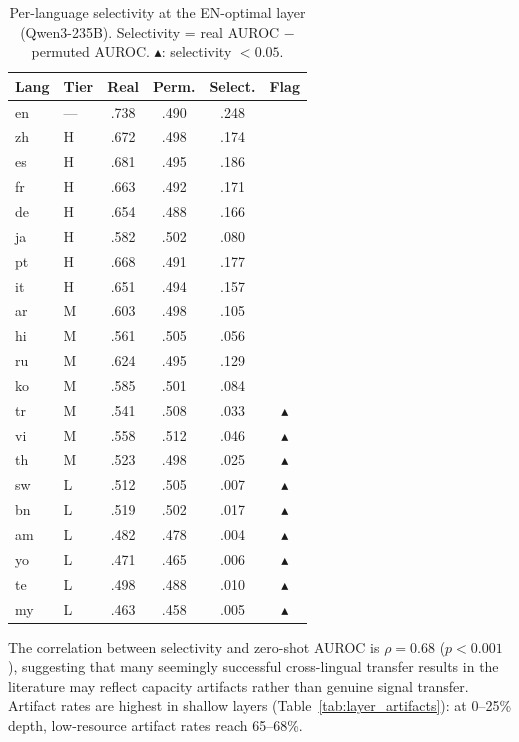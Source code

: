 \documentclass[11pt,a4paper]{article}
\newcommand{\auroc}{AUROC}
\begin{document}
\begin{table}[t]
\centering
\small
\caption{Per-language selectivity at the EN-optimal layer (Qwen3-235B). Selectivity = real \auroc{} $-$ permuted \auroc{}. $\blacktriangle$: selectivity $< 0.05$.}
\label{tab:selectivity}
\begin{tabular}{llcccc}
\toprule
Lang & Tier & Real & Perm. & Select. & Flag \\
\midrule
en & --- & .738 & .490 & .248 & \\
zh & H & .672 & .498 & .174 & \\
es & H & .681 & .495 & .186 & \\
fr & H & .663 & .492 & .171 & \\
de & H & .654 & .488 & .166 & \\
ja & H & .582 & .502 & .080 & \\
pt & H & .668 & .491 & .177 & \\
it & H & .651 & .494 & .157 & \\
\midrule
ar & M & .603 & .498 & .105 & \\
hi & M & .561 & .505 & .056 & \\
ru & M & .624 & .495 & .129 & \\
ko & M & .585 & .501 & .084 & \\
tr & M & .541 & .508 & .033 & $\blacktriangle$ \\
vi & M & .558 & .512 & .046 & $\blacktriangle$ \\
th & M & .523 & .498 & .025 & $\blacktriangle$ \\
\midrule
sw & L & .512 & .505 & .007 & $\blacktriangle$ \\
bn & L & .519 & .502 & .017 & $\blacktriangle$ \\
am & L & .482 & .478 & .004 & $\blacktriangle$ \\
yo & L & .471 & .465 & .006 & $\blacktriangle$ \\
te & L & .498 & .488 & .010 & $\blacktriangle$ \\
my & L & .463 & .458 & .005 & $\blacktriangle$ \\
\bottomrule
\end{tabular}
\end{table}

The correlation between selectivity and zero-shot \auroc{} is $\rho = 0.68$ ($p < 0.001$), suggesting that many seemingly successful cross-lingual transfer results in the literature may reflect capacity artifacts rather than genuine signal transfer.
Artifact rates are highest in shallow layers (Table~\ref{tab:layer_artifacts}): at 0--25\% depth, low-resource artifact rates reach 65--68\%.
\end{document}

